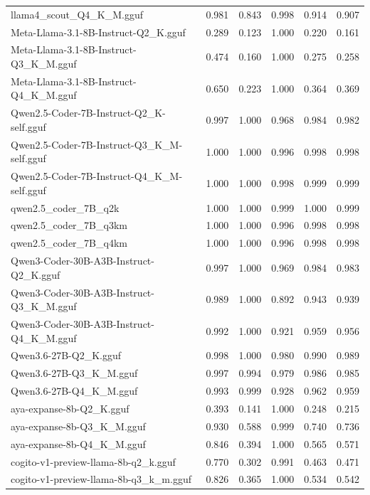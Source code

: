 \begin{table}[htbp]
{\begin{tabular}{lrrrrr}
    llama4\_scout\_Q4\_K\_M.gguf & 0.981 & 0.843 & 0.998 & 0.914 & 0.907 \\
    Meta-Llama-3.1-8B-Instruct-Q2\_K.gguf & 0.289 & 0.123 & 1.000 & 0.220 & 0.161 \\
    Meta-Llama-3.1-8B-Instruct-Q3\_K\_M.gguf & 0.474 & 0.160 & 1.000 & 0.275 & 0.258 \\
    Meta-Llama-3.1-8B-Instruct-Q4\_K\_M.gguf & 0.650 & 0.223 & 1.000 & 0.364 & 0.369 \\
    Qwen2.5-Coder-7B-Instruct-Q2\_K-self.gguf & 0.997 & 1.000 & 0.968 & 0.984 & 0.982 \\
    Qwen2.5-Coder-7B-Instruct-Q3\_K\_M-self.gguf & 1.000 & 1.000 & 0.996 & 0.998 & \cellcolor{green!20}0.998 \\
    Qwen2.5-Coder-7B-Instruct-Q4\_K\_M-self.gguf & 1.000 & 1.000 & 0.998 & 0.999 & \cellcolor{green!40}0.999 \\
    qwen2.5\_coder\_7B\_q2k & 1.000 & 1.000 & 0.999 & 1.000 & \cellcolor{green!50}0.999 \\
    qwen2.5\_coder\_7B\_q3km & 1.000 & 1.000 & 0.996 & 0.998 & \cellcolor{green!10}0.998 \\
    qwen2.5\_coder\_7B\_q4km & 1.000 & 1.000 & 0.996 & 0.998 & 0.998 \\
    Qwen3-Coder-30B-A3B-Instruct-Q2\_K.gguf & 0.997 & 1.000 & 0.969 & 0.984 & 0.983 \\
    Qwen3-Coder-30B-A3B-Instruct-Q3\_K\_M.gguf & 0.989 & 1.000 & 0.892 & 0.943 & 0.939 \\
    Qwen3-Coder-30B-A3B-Instruct-Q4\_K\_M.gguf & 0.992 & 1.000 & 0.921 & 0.959 & 0.956 \\
    Qwen3.6-27B-Q2\_K.gguf & 0.998 & 1.000 & 0.980 & 0.990 & 0.989 \\
    Qwen3.6-27B-Q3\_K\_M.gguf & 0.997 & 0.994 & 0.979 & 0.986 & 0.985 \\
    Qwen3.6-27B-Q4\_K\_M.gguf & 0.993 & 0.999 & 0.928 & 0.962 & 0.959 \\
    aya-expanse-8b-Q2\_K.gguf & 0.393 & 0.141 & 1.000 & 0.248 & 0.215 \\
    aya-expanse-8b-Q3\_K\_M.gguf & 0.930 & 0.588 & 0.999 & 0.740 & 0.736 \\
    aya-expanse-8b-Q4\_K\_M.gguf & 0.846 & 0.394 & 1.000 & 0.565 & 0.571 \\
    cogito-v1-preview-llama-8b-q2\_k.gguf & 0.770 & 0.302 & 0.991 & 0.463 & 0.471 \\
    cogito-v1-preview-llama-8b-q3\_k\_m.gguf & 0.826 & 0.365 & 1.000 & 0.534 & 0.542 \\

\end{tabular}}
\end{table}

